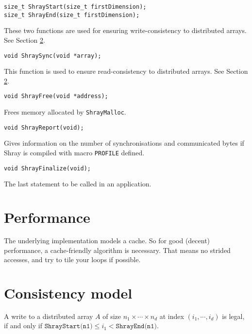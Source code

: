 \documentclass{article}
\begin{document}
\begin{lstlisting}
size_t ShrayStart(size_t firstDimension);
size_t ShrayEnd(size_t firstDimension);
\end{lstlisting}

These two functions are used for ensuring write-consistency to distributed arrays. See 
Section \ref{consistency}.

\begin{lstlisting}
void ShraySync(void *array);
\end{lstlisting}

This function is used to ensure read-consistency to distributed arrays. See Section 
\ref{consistency}.

\begin{lstlisting}
void ShrayFree(void *address);
\end{lstlisting}

Frees memory allocated by \texttt{ShrayMalloc}.

\begin{lstlisting}
void ShrayReport(void);
\end{lstlisting}

Gives information on the number of synchronisations and communicated bytes if Shray is compiled
with macro \texttt{PROFILE} defined.

\begin{lstlisting}
void ShrayFinalize(void);
\end{lstlisting}

The last statement to be called in an application.

\section{Performance}

The underlying implementation models a cache. So for good (decent) performance, a cache-friendly 
algorithm is necessary. That means no strided accesses, and try to tile your loops if possible. 

\section{Consistency model}\label{consistency}

A write to a distributed array $A$ of size $n_1 \times \cdots \times n_d$ at index 
$(i_1, \cdots, i_d)$ is legal, if and only if 
$\texttt{ShrayStart(n1)} \leq i_1 < \texttt{ShrayEnd(n1)}$.

\medskip
\end{document}
